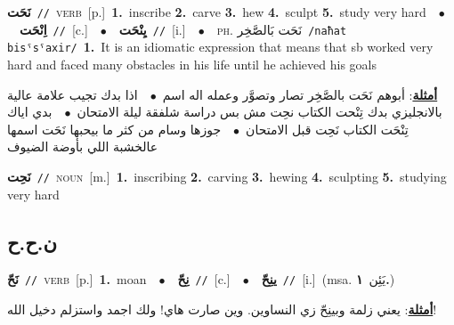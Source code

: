 \documentclass[10pt,a4paper,twoside]{article} %
\begin{document}
\begin{multicols}{2}
{\setlength\topsep{0pt}\textbf{\foreignlanguage{arabic}{نَحَت}}\ {\color{gray}\texttt{//}\color{black}}\ \textsc{verb}\ [p.]\ \textbf{1.}~inscribe  \textbf{2.}~carve  \textbf{3.}~hew  \textbf{4.}~sculpt  \textbf{5.}~study very hard\ \ $\bullet$\ \ \setlength\topsep{0pt}\textbf{\foreignlanguage{arabic}{اِنْحَت}}\ {\color{gray}\texttt{//}\color{black}}\ [c.]\ \ $\bullet$\ \ \setlength\topsep{0pt}\textbf{\foreignlanguage{arabic}{يِنْحَت}}\ {\color{gray}\texttt{//}\color{black}}\ [i.]\ \ $\bullet$\ \ \textsc{ph.} \color{gray} \foreignlanguage{arabic}{نَحَت بَالصَّخِر}\color{black}\ {\color{gray}\texttt{/{\sffamily naħat bisˤsˤaxir}/}\color{black}}\ \textbf{1.}~It is an idiomatic expression that means that sb worked very hard and faced many obstacles in his life until he achieved his goals\  \begin{flushright}\color{gray}\foreignlanguage{arabic}{\textbf{\underline{\foreignlanguage{arabic}{أمثلة}}}: أبوهم نَحَت بالصَّخِر تصار وتصوَّر وعمله اله اسم\ $\bullet$\ \  اذا بدك تجيب علامة عالية بالانجليزي بدك تِنْحت الكتاب نحِت مش بس دراسة شلفقة ليلة الامتحان\ $\bullet$\ \  بدي اياك تِنْحَت الكتاب نَحِت قبل الامتحان\ $\bullet$\ \  جوزها وسام من كثر ما بيحبها نَحَت اسمها عالخشبة اللي بأوضة الضيوف}\end{flushright}\color{black}} \vspace{2mm}

{\setlength\topsep{0pt}\textbf{\foreignlanguage{arabic}{نَحِت}}\ {\color{gray}\texttt{//}\color{black}}\ \textsc{noun}\ [m.]\ \textbf{1.}~inscribing  \textbf{2.}~carving  \textbf{3.}~hewing  \textbf{4.}~sculpting  \textbf{5.}~studying very hard\ } \vspace{2mm}

\vspace{-3mm}
\subsection*{\color{blue}\foreignlanguage{arabic}{ن.ح.ح}\color{blue}{}} 

{\setlength\topsep{0pt}\textbf{\foreignlanguage{arabic}{نَحّ}}\ {\color{gray}\texttt{//}\color{black}}\ \textsc{verb}\ [p.]\ \textbf{1.}~moan\ \ $\bullet$\ \ \setlength\topsep{0pt}\textbf{\foreignlanguage{arabic}{نِحّ}}\ {\color{gray}\texttt{//}\color{black}}\ [c.]\ \ $\bullet$\ \ \setlength\topsep{0pt}\textbf{\foreignlanguage{arabic}{ينِحّ}}\ {\color{gray}\texttt{//}\color{black}}\ [i.]\ \color{gray}(msa. \foreignlanguage{arabic}{يَئِن}~\foreignlanguage{arabic}{\textbf{١.}})\color{black}\  \begin{flushright}\color{gray}\foreignlanguage{arabic}{\textbf{\underline{\foreignlanguage{arabic}{أمثلة}}}: يعني زلمة وبينِحّ زي النساوين. وين صارت هاي! ولك اجمد واستزلم دخيل الله!}\end{flushright}\color{black}} \vspace{2mm}


\end{multicols}
\end{document}
